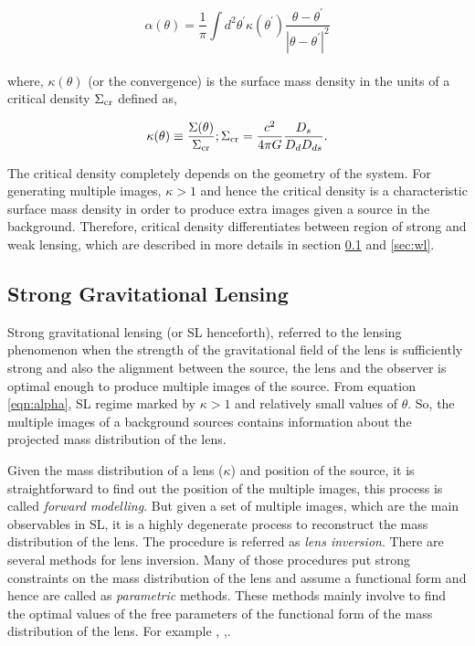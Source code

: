\begin{equation}
	\alpha(\theta) = \dfrac{1}{\pi} \int d^2\theta^{\prime}
						\kappa(\theta^{\prime})
						\dfrac{\theta-\theta^{\prime}}{|\theta-\theta^{\prime}|^2}
	\label{eqn:alpha}
\end{equation}
\\
where, $\kappa(\theta)$ (or the convergence) is the surface mass density in the 
units of a critical density $\Sigma_{\rm cr}$ defined as,

\begin{equation}
	\kappa(\theta) \equiv \dfrac{\Sigma(\theta)}{\Sigma_{\rm cr}}; 
	\Sigma_{\rm cr} = \dfrac{c^2}{4\pi G} \dfrac{D_s}{D_d D_{ds}}.
\end{equation}

The critical density completely depends on the geometry of the system. For generating
multiple images, $\kappa>1$ and hence the critical density is a characteristic 
surface mass density in order to produce extra images given a source in the background.
Therefore, critical density differentiates between region
of strong and weak lensing, which are described in more details in section \ref{sec:sl}
and \ref{sec:wl}.



\subsection{Strong Gravitational Lensing}\label{sec:sl}

Strong gravitational lensing (or SL henceforth), referred to the lensing phenomenon
when the strength of the gravitational field of the lens is sufficiently strong and 
also the alignment between the source, the lens and the observer is optimal enough to
produce multiple images of the source. From equation \ref{eqn:alpha}, SL regime marked
by $\kappa >1$ and relatively small values of $\theta$. So, the multiple images of a
background sources contains information about the projected mass distribution of the lens. 

Given the mass distribution of a lens ($\kappa$) and position of the source,
it is straightforward to find out the position of the multiple images, this process
is called {\it forward modelling}. But given a set of multiple images, which are the main 
observables in SL, it is a highly degenerate process to reconstruct the mass
distribution of the lens. The procedure is referred as {\it lens inversion}. There are 
several methods for lens inversion. Many of those procedures put strong constraints
on the mass distribution of the lens and assume a functional form and hence are called
as {\it parametric} methods. These methods mainly involve to find the optimal values 
of the free parameters of the functional form of the mass distribution of the lens. 
For example \cite{}, \cite{},\cite{}.


